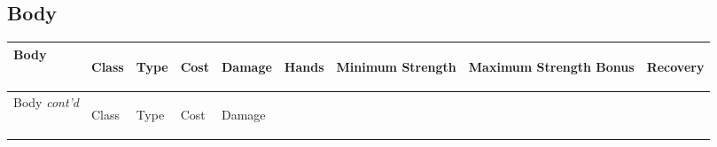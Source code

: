 \documentclass[twoside]{book}
\begin{document}
    

\subsection{Body}
    
\begin{longtable}{p{1.25in}llllp{2em}p{3em}p{3em}l} 
  Body
  &
  \begin{turn}{70}{Class}\end{turn}
          
  &
  \begin{turn}{70}{Type}\end{turn}
          
  &
  \begin{turn}{70}{Cost}\end{turn}
          
  &
  \begin{turn}{70}{Damage}\end{turn}
          
  &
  \begin{turn}{70}{Hands}\end{turn}
          
  &
  \begin{turn}{70}{Minimum Strength}\end{turn}
          
  &
  \begin{turn}{70}{Maximum Strength Bonus}\end{turn}
          
  &
  \begin{turn}{70}{Recovery}\end{turn}
          
  \\
  \hline
  \hline
  \endfirsthead
  Body \textit{cont'd}
        
  &
  \begin{turn}{70}{Class}\end{turn}
          
  &
  \begin{turn}{70}{Type}\end{turn}
          
  &
  \begin{turn}{70}{Cost}\end{turn}
          
  &
  \begin{turn}{70}{Damage}\end{turn}
          

\end{longtable}
\end{document}
